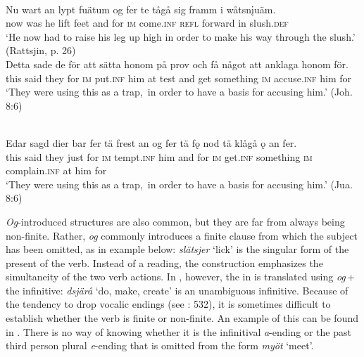 \documentclass[output=paper]{langscibook}
\begin{document}
\ex {}\\\label{ex:kalm:15b}
\gll Nu wart an lypt fuätum og fer te tågå sig framm i wåtsn\k{i}uäm.\\
now was he lift feet and for \textsc{im} come.\textsc{inf} \textsc{refl} forward in slush.\textsc{def}\\
\glt ‘He now had to raise his leg up high in order to make his way through the slush.’ (Rattsjin, p. 26)
\z 
\ex
\label{ex:kalm:16}
\ea {}\\\label{ex:kalm:16a}
\gll Detta sade de för att sätta honom på prov och få något att anklaga honom för.\\
this said they for \textsc{im} put.\textsc{inf} him at test and get something \textsc{im} accuse.\textsc{inf} him for\\
\glt ‘They were using this  as a trap,{~}in order to have a basis for accusing him.’ (Joh. 8:6)

\ex {}\\\label{ex:kalm:16b}
\gll Edar sagd dier bar fer tä frest an og fer tä fǫ nod tä klågå ǫ an fer.\\
this said they just for \textsc{im} tempt.\textsc{inf} him and for \textsc{im} get.\textsc{inf} something \textsc{im} complain.\textsc{inf} at him for\\
\glt ‘They were using this  as a trap,{~}in order to have a basis for accusing him.’ (Jua. 8:6)
\z 
\z 

\textit{Og}-introduced structures are also common, but they are far from always being non-finite. Rather, \textit{og} commonly introduces a finite clause from which the subject has been omitted, as in example  below: \textit{slätsjer} ‘lick’ is the singular form of the present  of the verb. Instead of a  reading, the construction emphasizes the simultaneity of the two verb actions. In , however, the  in  is translated using \textit{og}\,+\,the infinitive: \textit{dsjärå} ‘do, make, create’ is an unambiguous infinitive. Because of the  tendency to drop vocalic endings (see \citealt{AkerbergNystrom2012}: 532), it is sometimes difficult to establish whether the verb is finite or non-finite. An example of this can be found in . There is no way of knowing whether it is the infinitival \textit{a}{}-ending or the past  third person plural \textit{e}{}-ending that is omitted from the form \textit{myöt} ‘meet’. 
\end{document}
